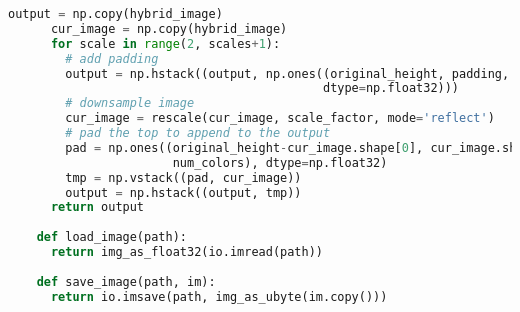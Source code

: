 \begin{lstlisting}[caption={student.py}, label={lst:code-example}, captionpos=t, language=python]
      output = np.copy(hybrid_image)
      cur_image = np.copy(hybrid_image)
      for scale in range(2, scales+1):
        # add padding
        output = np.hstack((output, np.ones((original_height, padding, num_colors),
                                            dtype=np.float32)))
        # downsample image
        cur_image = rescale(cur_image, scale_factor, mode='reflect')
        # pad the top to append to the output
        pad = np.ones((original_height-cur_image.shape[0], cur_image.shape[1],
                       num_colors), dtype=np.float32)
        tmp = np.vstack((pad, cur_image))
        output = np.hstack((output, tmp))
      return output
    
    def load_image(path):
      return img_as_float32(io.imread(path))
    
    def save_image(path, im):
      return io.imsave(path, img_as_ubyte(im.copy()))
    
\end{lstlisting}